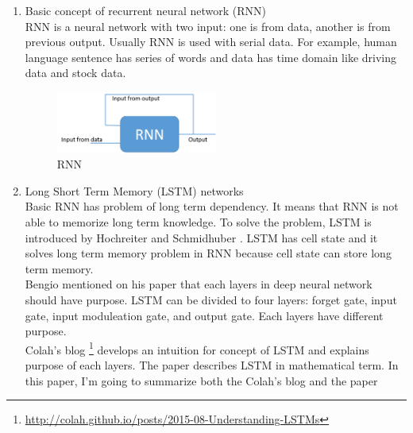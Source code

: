 \documentclass[12pt]{article}
\begin{document}
\begin{enumerate}
\item Basic concept of recurrent neural network (RNN)\\
	RNN is a neural network with two input: one is from data, another is from previous output. Usually RNN is used with serial data. For example, human language sentence has series of words and data has time domain like driving data and stock data.

\begin{figure}[H]%
    \centering
    \includegraphics[width=0.5\textwidth]{pictures/RNN.png}
    \caption{RNN}
    \label{fig:RNN}
\end{figure}

\item Long Short Term Memory (LSTM) networks\\
	Basic RNN has problem of long term dependency. It means that RNN is not able to memorize long term knowledge. To solve the problem, LSTM is introduced by Hochreiter and Schmidhuber \cite{hochreiter1997long}. LSTM has cell state and it solves long term memory problem in RNN because cell state can store long term memory.\\
	Bengio mentioned on his paper \cite{bengio2009learning} that each layers in deep neural network should have purpose. LSTM can be divided to four layers: forget gate, input gate, input moduleation gate, and output gate. Each layers have different purpose.\\
	 Colah's blog \footnote{\url{http://colah.github.io/posts/2015-08-Understanding-LSTMs}} develops an intuition for concept of LSTM and explains purpose of each layers. The paper \cite{zaremba2014recurrent} describes LSTM in mathematical term. In this paper, I'm going to summarize both the Colah's blog and the paper \cite{zaremba2014recurrent}
	

\end{enumerate}
\end{document}
